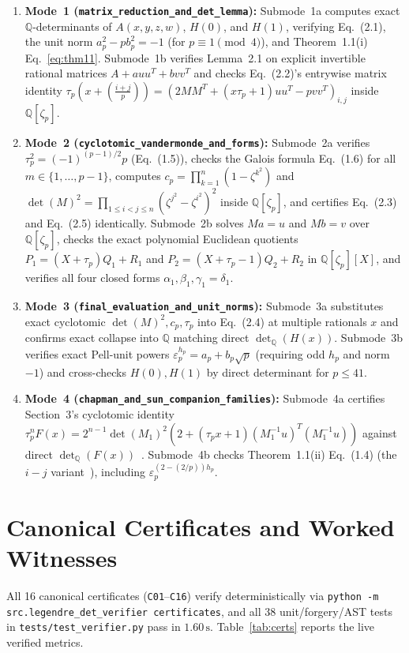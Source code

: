 \documentclass[10pt,twocolumn]{article}
\begin{document}
\begin{enumerate}\itemsep 1.5pt
\item \textbf{Mode~1 (\nolinkurl{matrix_reduction_and_det_lemma}):} Submode~1a computes exact $\mathbb{Q}$-determinants of $A(x,y,z,w)$, $H(0)$, and $H(1)$, verifying Eq.~(2.1), the unit norm $a_p^2 - p b_p^2 = -1$ (for $p\equiv 1\pmod 4$), and Theorem~1.1(i) Eq.~\eqref{eq:thm11}. Submode~1b verifies Lemma~2.1 on explicit invertible rational matrices $A+auu^T+bvv^T$ and checks Eq.~(2.2)'s entrywise matrix identity $\tau_p(x+(\tfrac{i+j}{p})) = (2MM^T + (x\tau_p+1)uu^T - pvv^T)_{i,j}$ inside $\mathbb{Q}[\zeta_p]$.
\item \textbf{Mode~2 (\nolinkurl{cyclotomic_vandermonde_and_forms}):} Submode~2a verifies $\tau_p^2 = (-1)^{(p-1)/2}p$ (Eq.~(1.5)), checks the Galois formula Eq.~(1.6) for all $m\in\{1,\dots,p-1\}$, computes $c_p = \prod_{k=1}^n(1-\zeta^{k^2})$ and $\det(M)^2 = \prod_{1\le i<j\le n}(\zeta^{j^2}-\zeta^{i^2})^2$ inside $\mathbb{Q}[\zeta_p]$, and certifies Eq.~(2.3) and Eq.~(2.5) identically. Submode~2b solves $Ma=u$ and $Mb=v$ over $\mathbb{Q}[\zeta_p]$, checks the exact polynomial Euclidean quotients $P_1=(X+\tau_p)Q_1+R_1$ and $P_2=(X+\tau_p-1)Q_2+R_2$ in $\mathbb{Q}[\zeta_p][X]$, and verifies all four closed forms $\alpha_1, \beta_1, \gamma_1=\delta_1$.
\item \textbf{Mode~3 (\nolinkurl{final_evaluation_and_unit_norms}):} Submode~3a substitutes exact cyclotomic $\det(M)^2, c_p, \tau_p$ into Eq.~(2.4) at multiple rationals $x$ and confirms exact collapse into $\mathbb{Q}$ matching direct $\det_{\mathbb{Q}}(H(x))$. Submode~3b verifies exact Pell-unit powers $\varepsilon_p^{h_p} = a_p + b_p\sqrt{p}$ (requiring odd $h_p$ and norm $-1$) and cross-checks $H(0), H(1)$ by direct determinant for $p\le 41$.
\item \textbf{Mode~4 (\nolinkurl{chapman_and_sun_companion_families}):} Submode~4a certifies Section~3's cyclotomic identity $\tau_p^n F(x) = 2^{n-1}\det(M_1)^2(2+(\tau_p x+1)(M_1^{-1}u)^T(M_1^{-1}u))$ against direct $\det_{\mathbb{Q}}(F(x))$~\cite{Chapman2004}. Submode~4b checks Theorem~1.1(ii) Eq.~(1.4) (the $i-j$ variant~\cite{LiuSunWang2027}), including $\varepsilon_p^{(2-(2/p))h_p}$.
\end{enumerate}

\section{Canonical Certificates and Worked Witnesses}
All 16 canonical certificates (\texttt{C01}--\texttt{C16}) verify deterministically via \texttt{python -m src.legendre\_det\_verifier certificates}, and all 38 unit/forgery/AST tests in \nolinkurl{tests/test_verifier.py} pass in $1.60\,\mathrm{s}$. Table~\ref{tab:certs} reports the live verified metrics.
\end{document}
